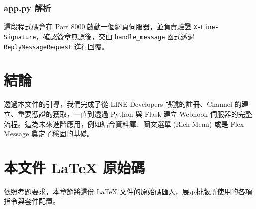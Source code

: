 \documentclass[12pt, a4paper]{article} %
\begin{document}
\subsubsection*{app.py 解析}
這段程式碼會在 Port 8000 啟動一個網頁伺服器，並負責驗證 \texttt{X-Line-Signature}，確認簽章無誤後，交由 \texttt{handle\_message} 函式透過 \texttt{ReplyMessageRequest} 進行回覆。



\newpage
\section{結論}
透過本文件的引導，我們完成了從 LINE Developers 帳號的註冊、Channel 的建立、重要憑證的獲取，一直到透過 Python 與 Flask 建立 Webhook 伺服器的完整流程。這為未來進階應用，例如結合資料庫、圖文選單 (Rich Menu) 或是 Flex Message 奠定了穩固的基礎。

\newpage
\section{本文件 LaTeX 原始碼}
依照考題要求，本章節將這份 LaTeX 文件的原始碼匯入，展示排版所使用的各項指令與套件配置。


\end{document}
